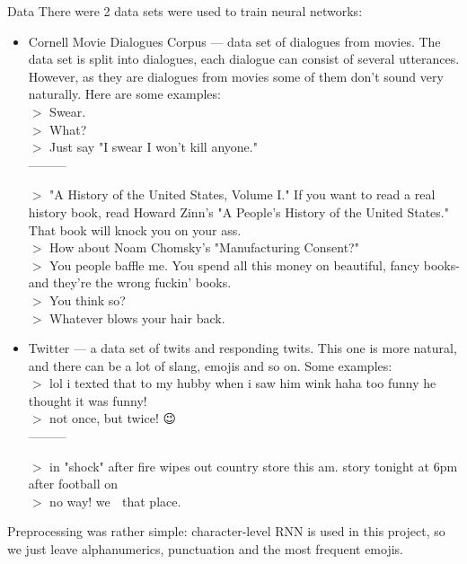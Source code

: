 \documentclass[12pt,a4paper]{article}
\begin{document}
\begin{section}{Data}
There were 2 data sets were used to train neural networks:
\begin{itemize}
    \item Cornell Movie Dialogues Corpus --- data set of dialogues from movies. The data set is split into dialogues, each dialogue can consist of several utterances. However, as they are dialogues from movies some of them don't sound very naturally.
    Here are some examples:\\

    \vspace{-1em}
    \footnotesize{
    $>$ Swear.\\
    $>$ What?\\
    $>$ Just say "I swear I won't kill anyone."\\
    }
    ---------

    \vspace{-1em}
    \footnotesize{
    $>$ "A History of the United States, Volume I." If you want to read a
    real history book, read Howard Zinn's "A People's History of
    the United States." That book will knock you on your ass.\\
    $>$ How about Noam Chomsky's "Manufacturing Consent?"\\
    $>$ You people baffle me. You spend all this money on beautiful,
    fancy books- and they're the wrong fuckin' books.\\
    $>$ You think so?\\
    $>$ Whatever blows your hair back.\\
    }

    \item \normalsize Twitter --- a data set of twits and responding twits. This one is more natural, and there can be a lot of slang, emojis and so on. Some examples:\\

    \vspace{-1em}
    \footnotesize{
    $>$ lol i texted that to my hubby when i saw him wink haha too funny
    he thought it was funny!\\
    $>$ not once, but twice! 😉\\
    }
    ---------

    \vspace{-1em}
    \footnotesize{
    $>$ in "shock" after fire wipes out country store this am.
    story tonight at 6pm after football on\\
    $>$ no way! we 💜 that place.\\
    }
\end{itemize}


Preprocessing was rather simple: character-level RNN is used in this project, so we just
leave alphanumerics, punctuation and the most frequent emojis.

\end{section}
\end{document}
